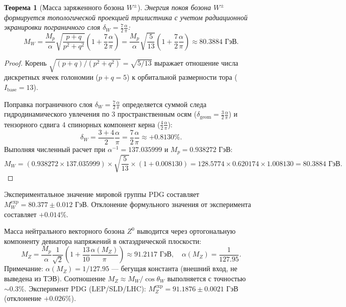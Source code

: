 \documentclass[11pt,a4paper]{article}
\newtheorem{theorem}{Теорема}[section]
\theoremstyle{definition}
\theoremstyle{remark}
\begin{document}
\begin{theorem}[Масса заряженного бозона $W^\pm$]
Энергия покоя бозона $W^\pm$ формируется топологической проекцией трилистника с учетом радиационной экранировки пограничного слоя $\delta_W = \frac{7}{2}\frac{\alpha}{\pi}$:
\begin{equation}
    M_W = \frac{M_p}{\alpha} \sqrt{\frac{p+q}{p^2+q^2}} \left( 1 + \frac{7}{2}\frac{\alpha}{\pi} \right) = \frac{M_p}{\alpha} \sqrt{\frac{5}{13}} \left( 1 + \frac{7}{2}\frac{\alpha}{\pi} \right) \approx \mathbf{80.3884\text{ ГэВ}}.
    \label{eq:mw_exact}
\end{equation}
\end{theorem}

\begin{proof}
Корень $\sqrt{(p+q)/(p^2+q^2)} = \sqrt{5/13}$ выражает отношение числа дискретных ячеек голономии ($p+q=5$) к орбитальной размерности тора ($I_{\mathrm{base}}=13$). 

Поправка пограничного слоя $\delta_W = \frac{7}{2}\frac{\alpha}{\pi}$ определяется суммой следа гидродинамического увлечения по 3 пространственным осям ($\delta_{\mathrm{geom}} = \frac{3}{2}\frac{\alpha}{\pi}$) и тензорного сдвига 4 спинорных компонент керна ($\frac{4}{2}\frac{\alpha}{\pi}$):
\begin{equation}
    \delta_W = \frac{3 + 4}{2} \frac{\alpha}{\pi} = \frac{7}{2}\frac{\alpha}{\pi} \approx +0.8130\%.
\end{equation}
Выполняя численный расчет при $\alpha^{-1} = 137.035999$ и $M_p = 0.938272\text{ ГэВ}$:
\begin{equation}
    M_W = (0.938272 \times 137.035999) \times \sqrt{\frac{5}{13}} \times (1 + 0.008130) = 128.5774 \times 0.620174 \times 1.008130 = \mathbf{80.3884\text{ ГэВ}}.
\end{equation}
\end{proof}
Экспериментальное значение мировой группы PDG составляет $M_W^{\mathrm{exp}} = 80.377 \pm 0.012\text{ ГэВ}$. Отклонение формульного значения от эксперимента составляет $+0.014\%$.

Масса нейтрального векторного бозона $Z^0$ выводится через ортогональную компоненту девиатора напряжений в октаэдрической плоскости:
\begin{equation}
    M_Z = \frac{M_p}{\alpha} \frac{1}{\sqrt{2}} \left( 1 + \frac{13}{10}\frac{\alpha(M_Z)}{\pi} \right) \approx \mathbf{91.2117\text{ ГэВ}}, \quad \alpha(M_Z) = \frac{1}{127.95}.
    \label{eq:mz_exact}
\end{equation}
Примечание: $\alpha(M_Z) = 1/127.95$ — бегущая константа (внешний вход, не выведена из ТЭВ). Соотношение $M_Z \approx M_W/\cos\theta_W$ выполняется с точностью $\sim 0.3\%$.
Эксперимент PDG (LEP/SLD/LHC): $M_Z^{\mathrm{exp}} = 91.1876 \pm 0.0021\text{ ГэВ}$ (отклонение $+0.026\%$).
\end{document}
